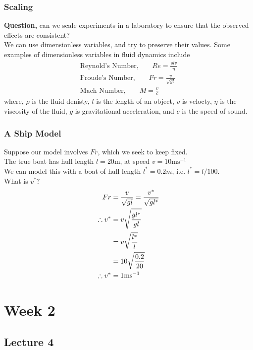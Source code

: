 \documentclass{report}
\begin{document}
\subsection*{Scaling}
\textbf{Question,} can we scale experiments in a laboratory to ensure that the observed effects are consistent?\\
We can use dimensionless variables, and try to preserve their values. Some examples of dimensionless variables in fluid dynamics include
\begin{gather*}
	\text{Reynold's Number,}\qquad Re = \frac{\rho lv}{\eta} \\
	\text{Froude's Number,}\qquad Fr = \frac{v}{\sqrt{gl}} \\
	\text{Mach Number,}\qquad M = \frac{v}{c}
\end{gather*}
where, $\rho$ is the fluid denisty, $l$ is the length of an object, $v$ is velocty, $\eta$ is the viscosity of the fluid, $g$ is gravitational acceleration, and $c$ is the speed of sound.

\subsection*{A Ship Model}
Suppose our model involves $Fr$, which we seek to keep fixed. \\
The true boat has hull length $l=20\text{m}$, at speed $v=10\text{ms}^{-1}$\\
We can model this with a boat of hull length $l^*=0.2m$, i.e. $l^*=l/100$. \\
What is $v^*$?
\begin{gather*}
	\begin{aligned}
		Fr &= \frac{v}{\sqrt{gl}} = \frac{v^*}{\sqrt{gl^*}} \\
		\therefore v^* &= v \sqrt{\frac{gl^*}{gl}} \\
			&= v \sqrt{\frac{l^*}{l}} \\
			&= 10 \sqrt{\frac{0.2}{20}} \\
		\therefore v^* &= 1 \text{ms}^{-1}
	\end{aligned}
\end{gather*}

\chapter{Week 2}
\section{Lecture 4}
\end{document}
